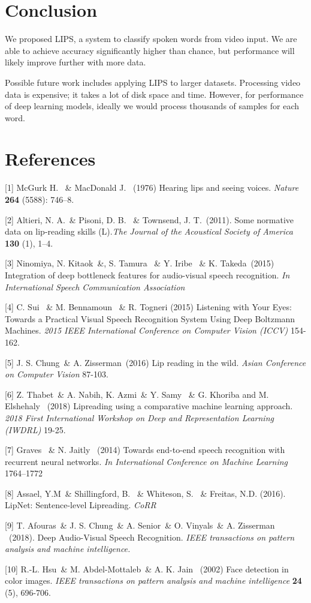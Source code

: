 \documentclass{article}
\begin{document}
\section{Conclusion}

We proposed LIPS, a system to classify spoken words from video input. We are able to achieve accuracy significantly higher than chance, but performance will likely improve further with more data. 

Possible future work includes applying LIPS to larger datasets. Processing video data is expensive; it takes a lot of disk space and time. However, for performance of deep learning models, ideally we would process thousands of samples for each word.

\section*{References}
\small

[1] McGurk H. \ \& MacDonald J. \ (1976) Hearing lips and seeing voices. {\it Nature} {\bf 264} (5588): 746–8.

[2] Altieri, N. A.\ \& Pisoni, D. B. \ \& Townsend, J. T.\  (2011). Some normative data on lip-reading skills (L).{\it The Journal of the Acoustical Society of America}  {\bf 130} (1), 1–4.

[3]  Ninomiya, N. Kitaok\ \&, S. Tamura \ \& Y. Iribe \ \&  K. Takeda\ (2015) Integration of deep bottleneck features for audio-visual speech recognition. {\it In International Speech Communication Association}

[4] C. Sui \ \& M. Bennamoun \ \& R. Togneri (2015) Listening with Your Eyes: Towards a Practical Visual Speech Recognition System Using Deep Boltzmann Machines. {\it 2015 IEEE International Conference on Computer Vision (ICCV)} 154-162.

[5] J. S. Chung\ \& A. Zisserman\ (2016) Lip reading in the wild. {\it Asian Conference on Computer Vision} 87-103.

[6] Z. Thabet\ \& A. Nabih, K. Azmi\ \& Y. Samy \ \& G. Khoriba and M. Elshehaly \ (2018) Lipreading using a comparative machine learning approach. {\it 2018 First International Workshop on Deep and Representation Learning (IWDRL)} 19-25.

[7]  Graves \ \& N. Jaitly \ (2014) Towards end-to-end speech recognition with recurrent neural networks. {\it In International Conference on Machine Learning} 1764–1772

[8] Assael, Y.M\ \& Shillingford, B. \ \& Whiteson, S. \ \& Freitas, N.D. (2016). LipNet: Sentence-level Lipreading. {\it CoRR}

[9] T. Afouras\ \& J. S. Chung\ \& A. Senior\ \& O. Vinyals\ \& A. Zisserman \ (2018). Deep Audio-Visual Speech Recognition. {\it IEEE transactions on pattern analysis and machine intelligence.}

[10] R.-L. Hsu\ \& M. Abdel-Mottaleb\ \& A. K. Jain \ (2002) Face detection in color images. {\it IEEE transactions on pattern analysis and machine intelligence} {\bf 24} (5), 696-706.
\end{document}
